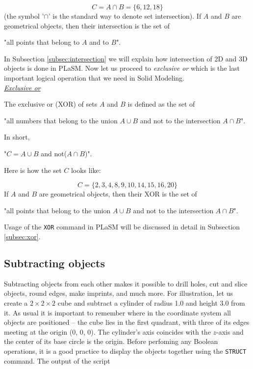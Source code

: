 $$
C = A \cap B = \{6, 12, 18\}
$$
(the symbol '$\cap$' is the standard way to denote set intersection). If $A$
and $B$ are geometrical objects, then their intersection is the set of \\

\centerline{
"all points that belong to $A$ {\color{red}and} to $B$".
}
\vspace{4mm}
\noindent
In Subsection \ref{subsec:intersection} we will explain how 
intersection of 2D and 3D objects is done in PLaSM. Now let us 
proceed to {\em exclusive or} which is the last important 
logical operation that we need in Solid Modeling.\\

\noindent
\underline{\em Exclusive or}

The exclusive or (XOR) of sets $A$ and $B$ is defined as the set of \\

\centerline{
"all numbers that belong to the union $A \cup B$ {\color{red}and not} to the intersection $A \cap B$".
}
\vspace{4mm}
\noindent
In short,\\

\centerline{
"$C = A \cup B$ {\color{red}and not}($A \cap B$)".
}
\vspace{4mm}
\noindent
Here is how the set $C$ looks like:

$$
C = \{2, 3, 4, 8, 9, 10, 14, 15, 16, 20\}
$$
If $A$ and $B$ are geometrical objects, then their XOR is the set of \\

\centerline{
"all points that belong to the union $A \cup B$ {\color{red}and not} to the intersection $A \cap B$".
}
\vspace{4mm}
\noindent
Usage of the {\tt XOR} command in PLaSM will be discussed in detail 
in Subsection \ref{subsec:xor}.


\subsection{Subtracting objects}\label{subsec:subtract}

Subtracting objects from each other makes it possible 
to drill holes, cut and slice objects, round edges, make 
imprints, and much more. 
For illustration, let us create a $2 \times 2 \times 2$ cube and subtract 
a cylinder of radius 1.0 and height 3.0 from it. As usual it is important to remember where 
in the coordinate system all objects are positioned -- the cube lies in the 
first quadrant, with three of its edges meeting at the origin (0, 0, 0).
The cylinder's axis coincides with the $z$-axis and the center of its base
circle is the origin. Before perfoming any Boolean operations, it is a good 
practice to display the objects together using the {\tt STRUCT} command. The 
output of the script

